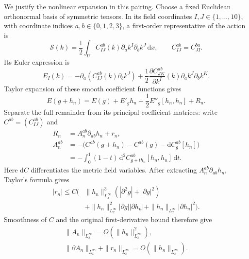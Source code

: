 \documentclass[11pt,a4paper]{article}
\numberwithin{equation}{section}
\newcommand{\dd}{\mathrm d}
\newcommand{\f}[2]{\frac{#1}{#2}}
\theoremstyle{definition}
\begin{document}
We justify the nonlinear expansion in this pairing. Choose a fixed
Euclidean orthonormal basis of symmetric tensors. In its field coordinates
$I,J\in\{1,\ldots,10\}$, with coordinate indices $a,b\in\{0,1,2,3\}$,
a first-order representative of the action is
\begin{equation*}
\mathcal S(k)=\f12\int_U C_{IJ}^{ab}(k)
                       \partial_ak^I\partial_bk^J\,\dd x,
\qquad C_{IJ}^{ab}=C_{JI}^{ba}.
\end{equation*}
Its Euler expression is
\begin{equation*}
E_I(k)=-\partial_a(C_{IJ}^{ab}(k)\partial_bk^J)
+\f12\f{\partial C_{JK}^{ab}}{\partial k^I}(k)
                    \partial_ak^J\partial_bk^K.
\end{equation*}
Taylor expansion of these smooth coefficient functions gives
\begin{equation*}
E(g+h_n)=E(g)+E'_gh_n+\f12E''_g[h_n,h_n]+R_n.
\end{equation*}
Separate the full remainder from its principal coefficient matrices:
write $C^{ab}=(C_{IJ}^{ab})$ and
\begin{equation*}
\begin{split}
R_n&=A_n^{ab}\partial_{ab}h_n+r_n,\\
A_n^{ab}
&=-\bigl(C^{ab}(g+h_n)-C^{ab}(g)
                    -\mathrm d C^{ab}_g[h_n]\bigr)\\
&=-\int_0^1(1-t)\,
       \mathrm d^2C^{ab}_{g+t h_n}[h_n,h_n]\,\dd t.
\end{split}
\end{equation*}
Here $\mathrm d C$ differentiates the metric field variables.
After extracting $A_n^{ab}\partial_{ab}h_n$, Taylor's formula gives
\begin{equation*}
\begin{split}
|r_n|\leq C\bigl(&\|h_n\|_{L^\infty_x}^3
                     (|\partial^2g|+|\partial g|^2)\\
&+\|h_n\|_{L^\infty_x}^2|\partial g||\partial h_n|
 +\|h_n\|_{L^\infty_x}|\partial h_n|^2\bigr).
\end{split}
\end{equation*}
Smoothness of $C$ and the original first-derivative bound therefore give
\begin{equation*}
\begin{gathered}
\|A_n\|_{L^\infty_x}=O(\|h_n\|_{L^\infty_x}^2),\\
\|\partial A_n\|_{L^\infty_x}+\|r_n\|_{L^\infty_x}
=O(\|h_n\|_{L^\infty_x}).
\end{gathered}
\end{equation*}
\end{document}
